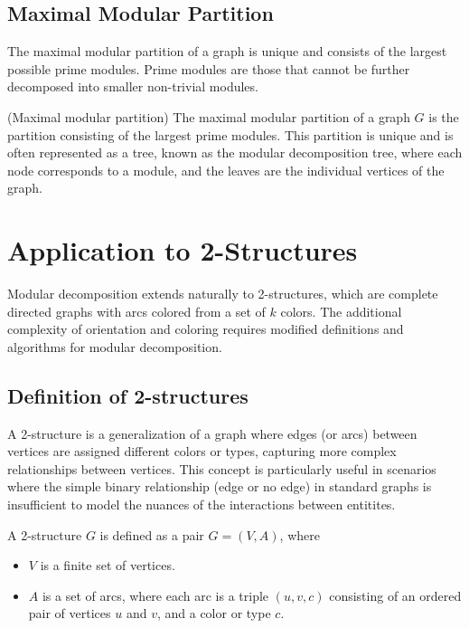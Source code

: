 \subsection*{Maximal Modular Partition}\label{subsec:maximal-modular-partition}

The maximal modular partition of a graph is unique and consists of the largest possible prime modules.
Prime modules are those that cannot be further decomposed into smaller non-trivial modules.

\begin{mydef}
(Maximal modular partition)
    The maximal modular partition of a graph $G$ is the partition consisting of the largest prime modules.
    This partition is unique and is often represented as a tree, known as the modular decomposition tree, where each node corresponds to a module, and the leaves are the individual vertices of the graph.
\end{mydef}


\section{Application to 2-Structures}\label{sec:application-to-2-structures}

Modular decomposition extends naturally to 2-structures, which are complete directed graphs with arcs colored from a set of $k$ colors.
The additional complexity of orientation and coloring requires modified definitions and algorithms for modular decomposition.

\subsection*{Definition of 2-structures}

A 2-structure is a generalization of a graph where edges (or arcs) between vertices are assigned different colors or types, capturing more complex relationships between vertices.
This concept is particularly useful in scenarios where the simple binary relationship (edge or no edge) in standard graphs is insufficient to model the nuances of the interactions between entitites.

\begin{mydef}
    A 2-structure $G$ is defined as a pair $G = (V, A)$, where
    \begin{itemize}
        \item $V$ is a finite set of vertices.
        \item $A$ is a set of arcs, where each arc is a triple $(u, v, c)$ consisting of an ordered pair of vertices $u$ and $v$, and a color or type $c$.
    \end{itemize}
\end{mydef}


